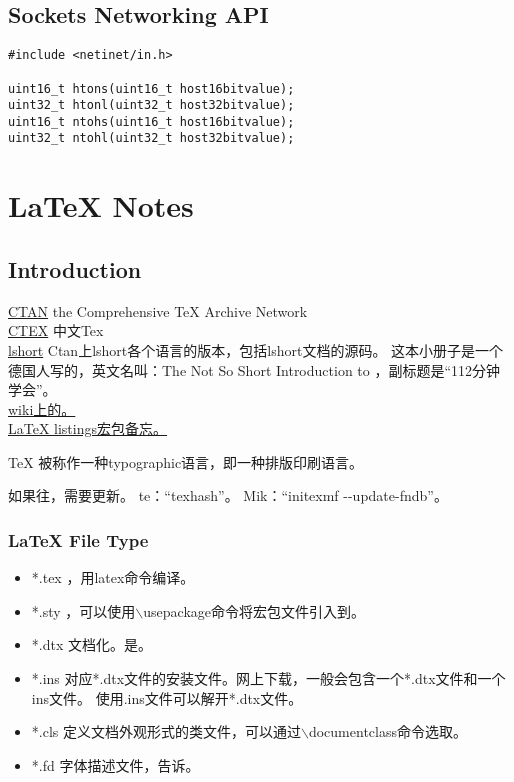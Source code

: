 \documentclass[a4paper,11pt,oneside,openany]{book}
\begin{document}
\begin{CJK*}{GBK}{song}
\section{Sockets Networking API}
\begin{lstlisting}[language={[ANSI]C}, frame=showbox]
#include <netinet/in.h>

uint16_t htons(uint16_t host16bitvalue);
uint32_t htonl(uint32_t host32bitvalue);
uint16_t ntohs(uint16_t host16bitvalue);
uint32_t ntohl(uint32_t host32bitvalue);
\end{lstlisting}


\chapter{\LaTeX{} Notes}
\index{\LaTeX}

\section{Introduction}
\noindent\href{http://www.ctan.org}{CTAN} the Comprehensive TeX Archive Network\\
\href{http://www.ctex.org}{CTEX} 中文Tex\\
\href{http://www.ctan.org/tex-archive/info/lshort/}{lshort} Ctan上lshort各个语言的版本，包括lshort文档的源码。
这本小册子是一个德国人写的，英文名叫：The Not So Short Introduction to \LaTeXe，副标题是``112分钟学会\LaTeXe''。\\
\href{http://en.wikibooks.org/wiki/LaTeX/Packages} {wiki上的。} \\
\href{http://blog.sina.com.cn/s/blog\_51e68f8d0100avil.html}{\LaTeX{} listings宏包备忘。}

\TeX{} 被称作一种typographic语言，即一种排版印刷语言。

如果往，需要更新。
te：``texhash''。
Mik：``initexmf -\mbox{}-update-fndb''。

\subsection{\LaTeX{} File Type}

\begin{itemize}
\item *.tex     ，用latex命令编译。
\item *.sty     ，可以使用$\backslash$usepackage命令将宏包文件引入到。
\item *.dtx     文档化。是。
\item *.ins     对应*.dtx文件的安装文件。网上下载，一般会包含一个*.dtx文件和一个ins文件。
                使用.ins文件可以解开*.dtx文件。
\item *.cls     定义文档外观形式的类文件，可以通过$\backslash$documentclass命令选取。
\item *.fd      字体描述文件，告诉。
\end{itemize}


\end{CJK*}
\end{document}

